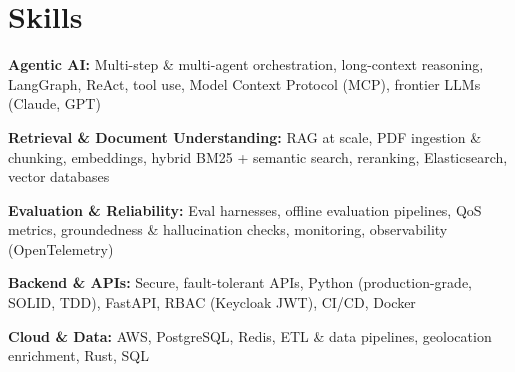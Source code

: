 \documentclass[10pt,a4paper]{article}
\begin{document}
\section{Skills}
\begin{tight}
  \item[\textcolor{accent}{\small$\bullet$}] \textbf{Agentic AI:} Multi-step \& multi-agent orchestration, long-context reasoning, LangGraph, ReAct, tool use, Model Context Protocol (MCP), frontier LLMs (Claude, GPT)
  \item[\textcolor{accent}{\small$\bullet$}] \textbf{Retrieval \& Document Understanding:} RAG at scale, PDF ingestion \& chunking, embeddings, hybrid BM25 + semantic search, reranking, Elasticsearch, vector databases
  \item[\textcolor{accent}{\small$\bullet$}] \textbf{Evaluation \& Reliability:} Eval harnesses, offline evaluation pipelines, QoS metrics, groundedness \& hallucination checks, monitoring, observability (OpenTelemetry)
  \item[\textcolor{accent}{\small$\bullet$}] \textbf{Backend \& APIs:} Secure, fault-tolerant APIs, Python (production-grade, SOLID, TDD), FastAPI, RBAC (Keycloak JWT), CI/CD, Docker
  \item[\textcolor{accent}{\small$\bullet$}] \textbf{Cloud \& Data:} AWS, PostgreSQL, Redis, ETL \& data pipelines, geolocation enrichment, Rust, SQL
\end{tight}

\end{document}
